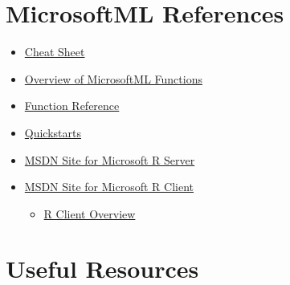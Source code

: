 \documentclass[]{book}
\providecommand{\tightlist}{%
  \setlength{\itemsep}{0pt}\setlength{\parskip}{0pt}}
\theoremstyle{definition}
\theoremstyle{definition}
\theoremstyle{definition}
\theoremstyle{remark}
\begin{document}
\section{MicrosoftML References}\label{microsoftml-references}

\begin{itemize}
\tightlist
\item
  \href{https://msdn.microsoft.com/en-us/microsoft-r/microsoftml-algorithm-cheat-sheet}{Cheat
  Sheet}
\item
  \href{https://msdn.microsoft.com/en-us/microsoft-r/overview-microsoftml-functions}{Overview
  of MicrosoftML Functions}
\item
  \href{https://msdn.microsoft.com/en-us/microsoft-r/microsoftml/microsoftml}{Function
  Reference}
\item
  \href{https://msdn.microsoft.com/en-us/microsoft-r/microsoftml-quickstarts}{Quickstarts}
\item
  \href{https://msdn.microsoft.com/en-us/microsoft-r/}{MSDN Site for
  Microsoft R Server}
\item
  \href{https://msdn.microsoft.com/en-us/microsoft-r/r-client}{MSDN Site
  for Microsoft R Client}

  \begin{itemize}
  \tightlist
  \item
    \href{https://channel9.msdn.com/blogs/MicrosoftR/Microsoft-Introduces-new-free-Microsoft-R-Client}{R
    Client Overview}
  \end{itemize}
\end{itemize}

\section{Useful Resources}\label{useful-resources}
\end{document}
